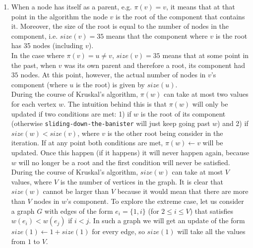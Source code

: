 \documentclass{article}
\begin{document}
\begin{enumerate}[1.]
    \item When a node has itself as a parent, e.g. $\pi(v) = v$, it means that at that point in the algorithm the node $v$ is the root of the component that contains it. Moreover, the size of the root is equal to the number of nodes in the component, i.e. $size(v) = 35$ means that the component where $v$ is the root has 35 nodes (including $v$).\\
    In the case where $\pi(v) = u \neq v$, $size(v) = 35$ means that at some point in the past, when $v$ was its own parent and therefore a root, its component had $35$ nodes. At this point, however, the actual number of nodes in $v$'s component (where $u$ is the root) is given by $size(u)$.\\
    During the course of Kruskal's algorithm, $\pi(w)$ can take at most two values for each vertex $w$. The intuition behind this is that $\pi(w)$ will only be updated if two conditions are met: 1) if $w$ is the root of its component (otherwise \texttt{sliding-down-the-banister} will just keep going past $w$) and 2) if $size(w) < size(v)$, where $v$ is the other root being consider in the iteration. If at any point both conditions are met, $\pi(w) \leftarrow v$ will be updated. Once this happen (if it happens) it will never happen again, because $w$ will no longer be a root and the first condition will never be satisfied.\\
    During the course of Kruskal's algorithm, $size(w)$ can take at most $V$ values, where $V$ is the number of vertices in the graph. It is clear that $size(w)$ cannot be larger than $V$ because it would mean that there are more than $V$ nodes in $w$'s component. To explore the extreme case, let us consider a graph $G$ with edges of the form $e_i = \{1, i\}$ (for $2 \leq i \leq V$) that satisfies $w(e_i) < w(e_{j})$ if $i < j$. In such a graph we will get an update of the form $size(1) \leftarrow 1 + size(1)$ for every edge, so $size(1)$ will take all the values from $1$ to $V$.

\end{enumerate}
\end{document}
